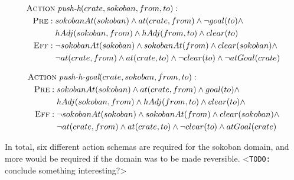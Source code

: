 \documentclass[../master.tex]{subfiles}
\begin{document}
\begin{align}
\begin{split} \label{act:pushh}
    \textsc{Action} &\; \textit{push-h}(crate, sokoban, from, to): \\
    \textsc{Pre}: \; & sokobanAt(sokoban) \land
                       at(crate, from) \land
                       \neg goal(to) \land \\
                     & hAdj(sokoban, from) \land
                       hAdj(from, to) \land
                       clear(to)
                       \\
    \textsc{Eff}: \; & \neg sokobanAt(sokoban) \land
                       sokobanAt(from) \land
                       clear(sokoban) \land \\
                     & \neg at(crate, from) \land
                       at(crate, to) \land
                       \neg clear(to) \land
                       \neg atGoal(crate)
\end{split}
\end{align}

\begin{align}
\begin{split} \label{act:pushhgoal}
    \textsc{Action} &\; \textit{push-h-goal}(crate, sokoban, from, to): \\
    \textsc{Pre}: \; & sokobanAt(sokoban) \land
                       at(crate, from) \land
                       goal(to) \land \\
                     & hAdj(sokoban, from) \land
                       hAdj(from, to) \land
                       clear(to) \land
                       \\
    \textsc{Eff}: \; & \neg sokobanAt(sokoban) \land
                       sokobanAt(from) \land
                       clear(sokoban) \land \\
                     & \neg at(crate, from) \land
                       at(crate, to) \land
                       \neg clear(to) \land
                       atGoal(crate)
\end{split}
\end{align}

In total, six different action schemas are required for the sokoban domain, and more would be required if the domain was to be made reversible. <\texttt{TODO:} conclude something interesting?>
\end{document}
